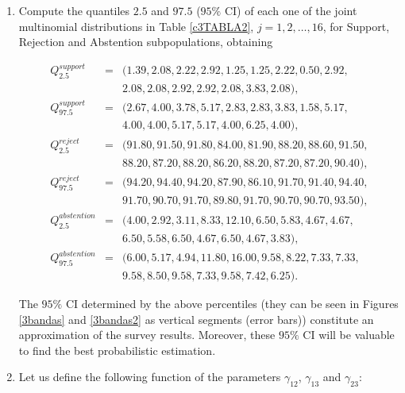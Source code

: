 \begin{enumerate}
\item Compute the quantiles $2.5$ and $97.5$ ($95\%$ CI) of each one of the joint multinomial distributions in Table \ref{c3TABLA2}, $j=1,2,\ldots,16$, for Support, Rejection and Abstention subpopulations, obtaining

\begin{eqnarray}
Q_{2.5}^{support} & = & ( 1.39, 2.08, 2.22, 2.92, 1.25, 1.25, 2.22, 0.50, 2.92, 			\nonumber \\ 
                  &   &   2.08, 2.08, 2.92, 2.92, 2.08, 3.83, 2.08 ), 						\nonumber \\
Q_{97.5}^{support} & = & ( 2.67, 4.00, 3.78, 5.17, 2.83, 2.83, 3.83, 1.58, 5.17, 		\nonumber \\ 
                   &   &   4.00, 4.00, 5.17, 5.17, 4.00, 6.25, 4.00 ),   					\nonumber \\
Q_{2.5}^{reject} & = & ( 91.80, 91.50, 91.80, 84.00, 81.90, 88.20, 88.60, 91.50, 		\nonumber \\ 
                 &   &   88.20, 87.20, 88.20, 86.20, 88.20, 87.20, 87.20, 90.40 ), 		\nonumber \\
Q_{97.5}^{reject} & = & ( 94.20, 94.40, 94.20, 87.90, 86.10, 91.70, 91.40, 94.40, 		\nonumber \\
                  &   &   91.70, 90.70, 91.70, 89.80, 91.70, 90.70, 90.70, 93.50 ), 	\nonumber \\                    
Q_{2.5}^{abstention} & = & ( 4.00, 2.92, 3.11, 8.33, 12.10, 6.50, 5.83, 4.67, 4.67, 	\nonumber \\ 
                 &   &   6.50, 5.58, 6.50, 4.67, 6.50, 4.67, 3.83 ), 						\nonumber \\
Q_{97.5}^{abstention} & = & ( 6.00, 5.17, 4.94, 11.80, 16.00, 9.58, 8.22, 7.33, 7.33,  \nonumber \\
                  &   &   9.58, 8.50, 9.58, 7.33, 9.58, 7.42, 6.25 ).  						\nonumber   
\end{eqnarray}

The $95\%$ CI determined by the above percentiles (they can be seen in Figures \ref{3bandas} and \ref{3bandas2} as vertical segments (error bars)) constitute an approximation of the survey results. Moreover, these $95\%$ CI will be valuable to find the best probabilistic estimation.

\item Let us define the following function of the parameters $\gamma_{12}$, $\gamma_{13}$ and $\gamma_{23}$: 


\end{enumerate}
